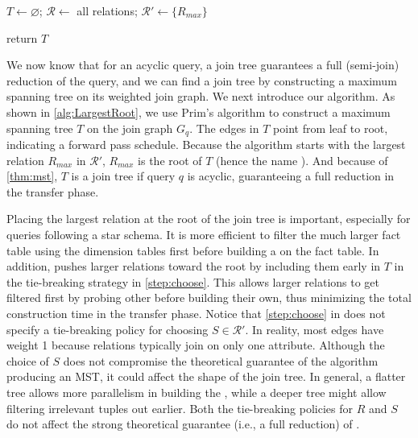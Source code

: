 \begin{algorithm}[t!]
    $T \gets \varnothing$; $\mathcal{R} \gets$ all relations; $\mathcal{R}' \gets \{R_{max}\}$\;


    return $T$\;
    \caption{\TreeStruct}
    \label{alg:LargestRoot}
\end{algorithm}

We now know that for an acyclic query, a join tree guarantees a full (semi-join) reduction of the query, and we can find a join tree by constructing a maximum spanning tree on its weighted join graph. We next introduce our \TreeStruct algorithm. As shown in \cref{alg:LargestRoot}, we use Prim's algorithm to construct a maximum spanning tree $T$ on the join graph $G_q$. The edges in $T$ point from leaf to root, indicating a forward pass schedule. Because the algorithm starts with the largest relation $R_{max}$ in $\mathcal{R}'$, $R_{max}$ is the root of $T$ (hence the name \TreeStruct). And because of \cref{thm:mst}, $T$ is a join tree if query $q$ is acyclic, guaranteeing a full reduction in the transfer phase. 

Placing the largest relation at the root of the join tree is important, especially for queries following a star schema. It is more efficient to filter the much larger fact table using the dimension tables first before building a \BF on the fact table. In addition, \TreeStruct pushes larger relations toward the root by including them early in $T$ in the tie-breaking strategy in \cref{step:choose}. This allows larger relations to get filtered first by probing other \BFs before building their own, thus minimizing the total \BF construction time in the transfer phase. Notice that \cref{step:choose} in \TreeStruct does not specify a tie-breaking policy for choosing $S \in \mathcal{R}'$. In reality, most edges have weight 1 because relations typically join on only one attribute. Although the choice of $S$ does not compromise the theoretical guarantee of the algorithm producing an MST, it could affect the shape of the join tree. In general, a flatter tree allows more parallelism in building the \BFs, while a deeper tree might allow filtering irrelevant tuples out earlier. Both the tie-breaking policies for $R$ and $S$ do not affect the strong theoretical guarantee (i.e., a full reduction) of \TreeStruct.

